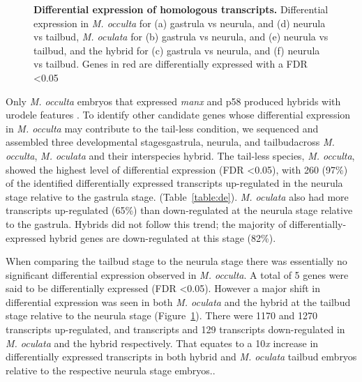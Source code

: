 \begin{landscape}
\begin{figure}[!H]
{	}
	\caption{\textbf{Differential expression of homologous transcripts.} Differential expression in \textit{M. occulta} for (a) gastrula vs neurula, and (d) neurula vs tailbud, \textit{M. oculata} for (b) gastrula vs neurula, and (e) neurula vs tailbud, and the hybrid for (c) gastrula vs neurula, and (f) neurula vs tailbud. Genes in red are differentially expressed with a FDR \textless 0.05}
	\label{fig:de_plots}
\end{figure}
\end{landscape}

Only \textit{M. occulta} embryos that expressed \textit{manx} and p58 produced hybrids with urodele features \cite{jeffery_factors_1992,swalla_requirement_1996}. To identify other candidate genes whose differential expression in \textit{M. occulta} may contribute to the tail-less condition, we sequenced and assembled three developmental stages\textemdash gastrula, neurula, and tailbud\textemdash across \textit{M. occulta}, \textit{M. oculata} and their interspecies hybrid. The tail-less species, \textit{M. occulta}, showed the highest level of differential expression (FDR \textless 0.05), with 260 (97\%) of the identified differentially expressed transcripts up-regulated in the neurula stage relative to the gastrula stage. (Table~\ref{table:de}). \textit{M. oculata} also had more transcripts up-regulated (65\%) than down-regulated at the neurula stage relative to the gastrula. Hybrids did not follow this trend; the majority of differentially-expressed hybrid genes are down-regulated at this stage (82\%).  

When comparing the tailbud stage to the neurula stage there was essentially no significant differential expression observed in \textit{M. occulta}. A total of 5 genes were said to be differentially expressed (FDR \textless 0.05). However a major shift in differential expression was seen in both \textit{M. oculata} and the hybrid at the tailbud stage relative to the neurula stage (Figure~\ref{fig:de_plots}). There were 1170 and 1270 transcripts up-regulated, and transcripts and 129 transcripts down-regulated in \textit{M. oculata} and the hybrid respectively. That equates to a 10\textit{x} increase in differentially expressed transcripts in both hybrid and \textit{M. oculata} tailbud embryos relative to the respective neurula stage embryos..

